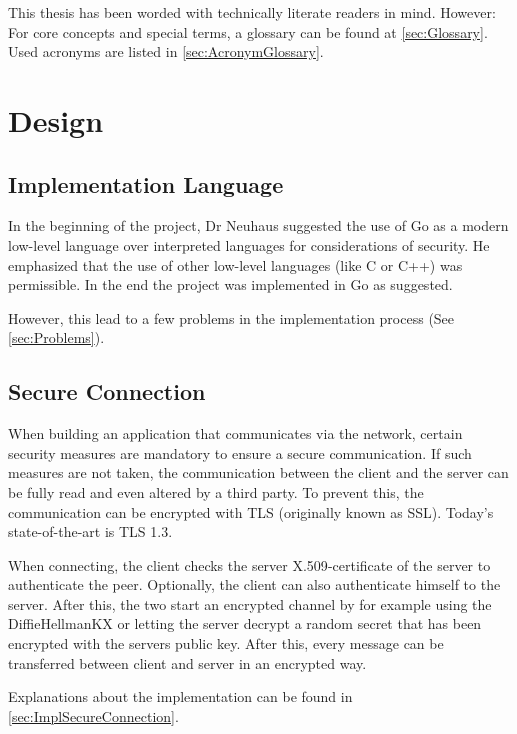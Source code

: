 \documentclass[10pt,a4paper,titlepage,twoside,english,final]{zhawreprt}
\begin{document}
\vspace{1.5cm}
This thesis has been worded with technically literate readers in mind. However: For core concepts and special terms, a glossary can be found at \ref{sec:Glossary}. Used acronyms are listed in \ref{sec:AcronymGlossary}.

\chapter{Design}\label{chp:Design}
\section{Implementation Language}\label{sec:DesignImplementationLanguage}
In the beginning of the project, Dr Neuhaus suggested the use of \gls{Go} as a modern low-level language over interpreted languages for considerations of security. He emphasized that the use of other low-level languages (like \gls{C} or \gls{C++}) was permissible. In the end the project was implemented in \gls{Go} as suggested.

However, this lead to a few problems in the implementation process (See \ref{sec:Problems}).

\section{Secure Connection}\label{sec:DesignSecureConnection}
When building an application that communicates via the network, certain security measures are mandatory to ensure a secure communication. If such measures are not taken, the communication between the client and the server can be fully read and even altered by a third party. To prevent this, the communication can be encrypted with \gls{TLS} (originally known as \gls{SSL}). Today's state-of-the-art is \gls{TLS} 1.3\citep{rfc8446}.

When connecting, the client checks the server \gls{X.509}-certificate of the server to authenticate the peer. Optionally, the client can also authenticate himself to the server. After this, the two start an encrypted channel by for example using the \gls{DiffieHellmanKX} or letting the server decrypt a random secret that has been encrypted with the servers public key. After this, every message can be transferred between client and server in an encrypted way.

Explanations about the implementation can be found in \ref{sec:ImplSecureConnection}.
\end{document}
